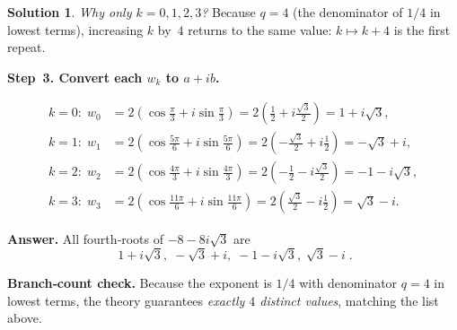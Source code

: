 \documentclass[12pt]{article}
\theoremstyle{definition} %
\newtheorem{solution}{Solution}
\theoremstyle{plain} %
\begin{document}
\begin{solution}
    \emph{Why only $k=0,1,2,3$?}  
    Because $q=4$ (the denominator of $1/4$ in lowest terms), increasing $k$
    by $4$ returns to the same value: $k\mapsto k+4$ is the first repeat.
    
    \bigskip
    \textbf{Step 3.  Convert each $w_k$ to $a+ib$.}
    
    \[
    \begin{aligned}
    k=0:\;w_0&=2\!\left(\cos\frac{\pi}{3}+i\sin\frac{\pi}{3}\right)
             =2\!\left(\frac12+i\frac{\sqrt3}{2}\right)
             =\boxed{1+i\sqrt3},\\[6pt]
    k=1:\;w_1&=2\!\left(\cos\frac{5\pi}{6}+i\sin\frac{5\pi}{6}\right)
             =2\!\left(-\frac{\sqrt3}{2}+i\frac12\right)
             =\boxed{-\sqrt3+i},\\[6pt]
    k=2:\;w_2&=2\!\left(\cos\frac{4\pi}{3}+i\sin\frac{4\pi}{3}\right)
             =2\!\left(-\frac12-i\frac{\sqrt3}{2}\right)
             =\boxed{-1-i\sqrt3},\\[6pt]
    k=3:\;w_3&=2\!\left(\cos\frac{11\pi}{6}+i\sin\frac{11\pi}{6}\right)
             =2\!\left(\frac{\sqrt3}{2}-i\frac12\right)
             =\boxed{\sqrt3-i}.
    \end{aligned}
    \]
    
    \bigskip
    \textbf{Answer.}  All fourth‑roots of $-8-8i\sqrt3$ are
    \[
    \boxed{\;
       1+i\sqrt3,\;
       -\sqrt3+i,\;
       -1-i\sqrt3,\;
       \sqrt3-i
    \;}.
    \]
    
    \bigskip
    \textbf{Branch‑count check.}  
    Because the exponent is $1/4$ with denominator $q=4$ in lowest terms,
    the theory guarantees \emph{exactly $4$ distinct values}, matching the list above.
    \end{solution}
\end{document}
